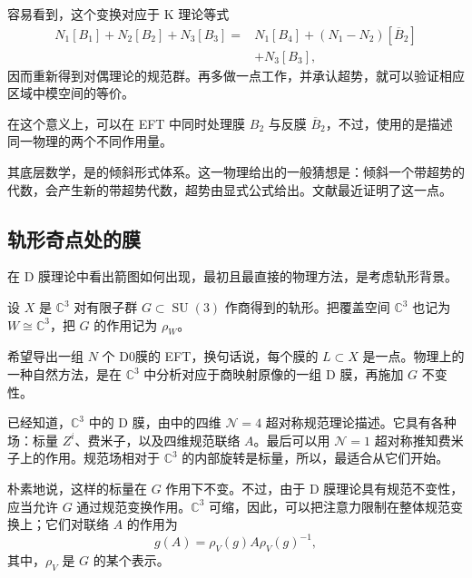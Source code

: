 容易看到，这个变换对应于 K 理论等式
\[
\begin{aligned}
N_1[B_1]+N_2[B_2]+N_3[B_3]
={}&N_1[B_4]+(N_1-N_2)[\overline B_2]\\
&+N_3[B_3],
\end{aligned}
\]
因而重新得到对偶理论的规范群。再多做一点工作，并承认超势，就可以验证相应区域中模空间的等价。

在这个意义上，可以在 EFT 中同时处理膜 $B_2$ 与反膜 $\overline B_2$，不过，使用的是描述同一物理的两个不同作用量。

其底层数学，是的倾斜形式体系。这一物理给出的一般猜想是：倾斜一个带超势的代数，会产生新的带超势代数，超势由显式公式给出。文献最近证明了这一点。

\subsection{轨形奇点处的膜}\label{sec:5.4.5}

在 D 膜理论中看出箭图如何出现，最初且最直接的物理方法，是考虑轨形背景。

设 $X$ 是 $\mathbb{C}^3$ 对有限子群 $G\subset\operatorname{SU}(3)$ 作商得到的轨形。把覆盖空间 $\mathbb{C}^3$ 也记为 $W\cong\mathbb{C}^3$，把 $G$ 的作用记为 $\rho_W$。

希望导出一组 $N$ 个 D0膜的 EFT，换句话说，每个膜的 $L\subset X$ 是一点。物理上的一种自然方法，是在 $\mathbb{C}^3$ 中分析对应于商映射原像的一组 D 膜，再施加 $G$ 不变性。

已经知道，$\mathbb{C}^3$ 中的 D 膜，由中的四维 $\mathcal{N}=4$ 超对称规范理论描述。它具有各种场：标量 $Z^i$、费米子，以及四维规范联络 $A$。最后可以用 $\mathcal{N}=1$ 超对称推知费米子上的作用。规范场相对于 $\mathbb{C}^3$ 的内部旋转是标量，所以，最适合从它们开始。

朴素地说，这样的标量在 $G$ 作用下不变。不过，由于 D 膜理论具有规范不变性，应当允许 $G$ 通过规范变换作用。$\mathbb{C}^3$ 可缩，因此，可以把注意力限制在整体规范变换上；它们对联络 $A$ 的作用为
\begin{equation}\label{eq:5.103}
g(A)=\rho_V(g)A\rho_V(g)^{-1},
\end{equation}
其中，$\rho_V$ 是 $G$ 的某个表示。

